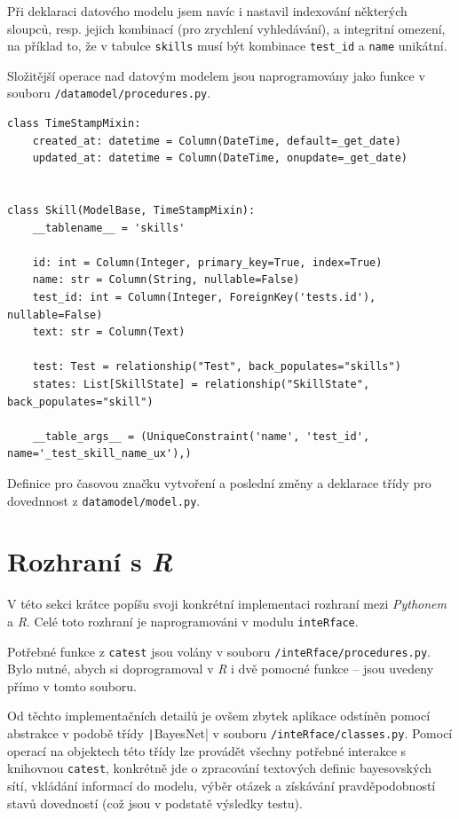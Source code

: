 \documentclass[a4paper,twoside,12pt]{scrbook}
\begin{document}
Při deklaraci datového modelu jsem navíc i nastavil indexování některých sloupců, resp. jejich kombinací (pro zrychlení vyhledávání), a integritní omezení, na příklad to, že v tabulce \texttt{skills} musí být kombinace \texttt{test\_id} a \texttt{name} unikátní.

Složitější operace nad datovým modelem jsou naprogramovány jako funkce v souboru \texttt{/datamodel/procedures.py}.

\begin{listing}
\centering
\begin{verbatim}
class TimeStampMixin:
    created_at: datetime = Column(DateTime, default=_get_date)
    updated_at: datetime = Column(DateTime, onupdate=_get_date)


class Skill(ModelBase, TimeStampMixin):
    __tablename__ = 'skills'

    id: int = Column(Integer, primary_key=True, index=True)
    name: str = Column(String, nullable=False)
    test_id: int = Column(Integer, ForeignKey('tests.id'), nullable=False)
    text: str = Column(Text)

    test: Test = relationship("Test", back_populates="skills")
    states: List[SkillState] = relationship("SkillState", back_populates="skill")

    __table_args__ = (UniqueConstraint('name', 'test_id', name='_test_skill_name_ux'),)
\end{verbatim}
\caption{Definice  pro časovou značku vytvoření a poslední změny a deklarace třídy pro dovednnost z \texttt{datamodel/model.py}.}
\label{lst:SkillDeclaration}
\end{listing}

\section{Rozhraní s \textit{R}}
V této sekci krátce popíšu svoji konkrétní implementaci rozhraní mezi \textit{Pythonem} a \textit{R}. Celé toto rozhraní je naprogramováni v modulu \texttt{inteRface}.

Potřebné funkce z \texttt{catest} jsou volány v souboru \texttt{/inteRface/procedures.py}. Bylo nutné, abych si doprogramoval v \textit{R} i dvě pomocné funkce -- jsou uvedeny přímo v tomto souboru.

Od těchto implementačních detailů je ovšem zbytek aplikace odstíněn pomocí abstrakce v podobě třídy \texttt|BayesNet| v souboru \texttt{/inteRface/classes.py}. Pomocí operací na objektech této třídy lze provádět všechny potřebné interakce s knihovnou \texttt{catest}, konkrétně jde o zpracování textových definic bayesovských sítí, vkládání informací do modelu, výběr otázek a získávání pravděpodobností stavů dovedností (což jsou v podstatě výsledky testu).
\end{document}
